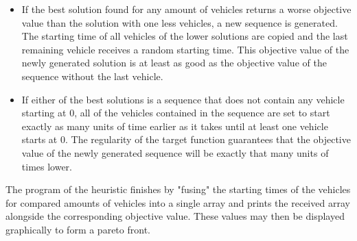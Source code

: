 \begin{itemize}
  \item If the best solution found for any amount of vehicles returns a worse objective value than the solution with one less vehicles, a new sequence
    is generated. The starting time of all vehicles of the lower solutions are copied and the last remaining vehicle receives a random starting time.
    This objective value of the newly generated solution is at least as good as the objective value of the sequence without the last vehicle.
  \item If either of the best solutions is a sequence that does not contain any vehicle starting at 0, all of the vehicles contained in the sequence
    are set to start exactly as many units of time earlier as it takes until at least one vehicle starts at 0. The regularity of the target function
    guarantees that the objective value of the newly generated sequence will be exactly that many units of times lower.
\end{itemize}

The program of the heuristic finishes by "fusing" the starting times of the vehicles for compared amounts of vehicles into a single array and prints
the received array alongside the corresponding objective value. These values may then be displayed graphically to form a pareto front.